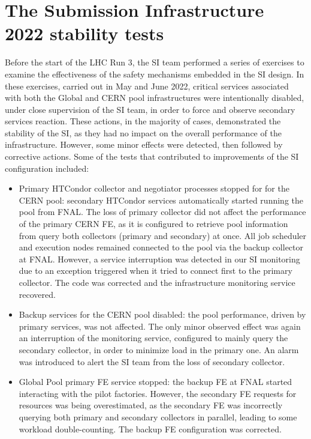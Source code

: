 \documentclass[a4paper]{jpconf}
\begin{document}
\section{The Submission Infrastructure 2022 stability tests}\label{sec:drills}
Before the start of the LHC Run 3, the SI team performed a series of exercises to examine the effectiveness of the safety mechanisms embedded in the SI design. In these exercises, carried out in May and June 2022, critical services associated with both the Global and CERN pool infrastructures were intentionally disabled, under close supervision of the SI team, in order to force and observe secondary services reaction. These actions, in the majority of cases, demonstrated the stability of the SI, as they had no impact on the overall performance of the infrastructure. However, some minor effects were detected, then followed by corrective actions. Some of the tests that contributed to improvements of the SI configuration included:

\begin{itemize}
\item Primary HTCondor collector and negotiator processes stopped for for the CERN pool: secondary HTCondor services automatically started running the pool from FNAL. The loss of primary collector did not affect the performance of the primary CERN FE, as it is configured to retrieve pool information from query both collectors (primary and secondary) at once. All job scheduler and execution nodes remained connected to the pool via the backup collector at FNAL. However, a service interruption was detected in our SI monitoring due to an exception triggered when it tried to connect first to the primary collector. The code was corrected and the infrastructure monitoring service recovered.

\item Backup services for the CERN pool disabled: the pool performance, driven by primary services, was not affected. The only minor observed effect was again an interruption of the monitoring service, configured to mainly query the secondary collector, in order to minimize load in the primary one. An alarm was introduced to alert the SI team from the loss of secondary collector.

\item Global Pool primary FE service stopped: the backup FE at FNAL started interacting with the pilot factories. However, the secondary FE requests for resources was being overestimated, as the secondary FE was incorrectly querying both primary and secondary collectors in parallel, leading to some workload double-counting. The backup FE configuration was corrected.
\end{itemize}
\end{document}
